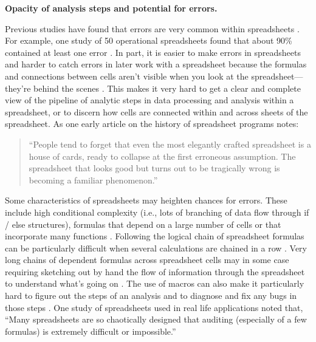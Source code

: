 \documentclass[]{tufte-book}
\begin{document}
\textbf{Opacity of analysis steps and potential for errors.}

Previous studies have found that errors are very common within spreadsheets
\citep{hermans2016spreadsheets}. For example, one study of 50 operational
spreadsheets found that about 90\% contained at least one error
\citep{powell2009errors}. In part, it is easier to make errors in spreadsheets and
harder to catch errors in later work with a spreadsheet because the formulas and
connections between cells aren't visible when you look at the
spreadsheet---they're behind the scenes \citep{birch2018future}. This makes it very
hard to get a clear and complete view of the pipeline of analytic steps in data
processing and analysis within a spreadsheet, or to discern how cells
are connected within and across sheets of the spreadsheet. As one early article on
the history of spreadsheet programs notes:

\begin{quote}
``People tend to forget that even the most elegantly crafted spreadsheet is a
house of cards, ready to collapse at the first erroneous assumption. The
spreadsheet that looks good but turns out to be tragically wrong is becoming
a familiar phenomenon.'' \citep{levy1984spreadsheet}
\end{quote}

Some characteristics of spreadsheets may heighten chances for errors. These
include high conditional complexity (i.e., lots of branching of data flow
through if / else structures), formulas that depend on a large number of cells
or that incorporate many functions \citep{hermans2016spreadsheets}. Following the
logical chain of spreadsheet formulas can be particularly difficult when several
calculations are chained in a row \citep{hermans2015enron}. Very long chains of
dependent formulas across spreadsheet cells may in some case requiring sketching
out by hand the flow of information through the spreadsheet to understand what's
going on \citep{nardi1990spreadsheet}. The use of macros can also make it
particularly hard to figure out the steps of an analysis and to diagnose and fix
any bugs in those steps \citep{nash2006spreadsheets, creeth1985microcomputer}. One
study of spreadsheets used in real life applications noted that, ``Many
spreadsheets are so chaotically designed that auditing (especially of a few
formulas) is extremely difficult or impossible.'' \citep{powell2009errors}
\end{document}
